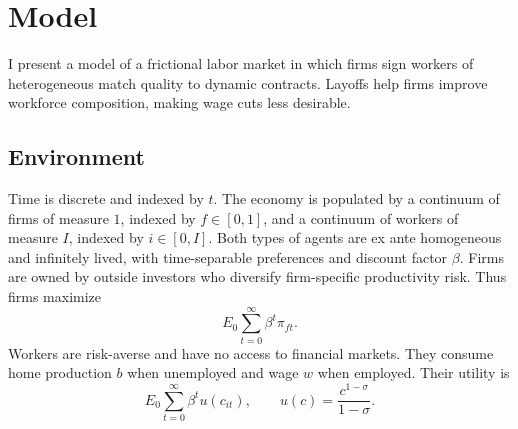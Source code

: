 \section{Model}

I present a model of a frictional labor market in which firms sign workers of heterogeneous match quality to dynamic contracts. Layoffs help firms improve workforce composition, making wage cuts less desirable.

\subsection{Environment} %
Time is discrete and indexed by $t$. The economy is populated by a continuum of firms of measure $1$, indexed by $f \in [0,1]$, and a continuum of workers of measure $I$, indexed by $i \in [0,I]$. Both types of agents are ex ante homogeneous and infinitely lived, with time-separable preferences and discount factor $\beta$. Firms are owned by outside investors who diversify firm-specific productivity risk. Thus firms maximize
\[
E_0 \sum_{t=0}^{\infty} \beta^t \pi_{ft}.
\]
Workers are risk-averse and have no access to financial markets. They consume home production $b$ when unemployed and wage $w$ when employed. Their utility is
\[
E_0 \sum_{t=0}^{\infty} \beta^t u(c_{it}), \qquad u(c)=\frac{c^{1-\sigma}}{1-\sigma}.
\]

